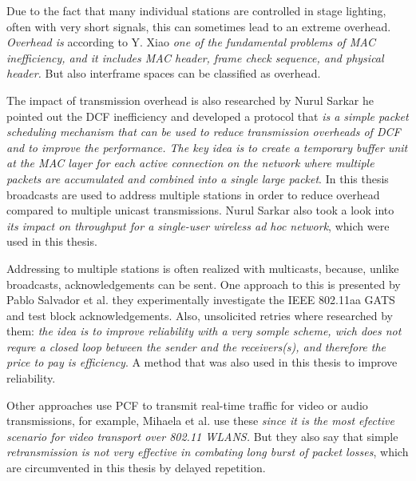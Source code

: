 Due to the fact that many individual stations are controlled in stage lighting, 
often with very short signals, this can sometimes lead to an extreme overhead.
\emph{Overhead is} 
according to Y. Xiao \cite{PerformanceEnhancement}
\emph{one of the fundamental problems of MAC inefficiency, and it includes MAC header, frame check sequence, and physical header.}
But also interframe spaces can be classified as overhead.

The impact of transmission overhead is also researched by Nurul Sarkar \cite{TheImpactOfOverheads}
he pointed out the DCF inefficiency and developed a protocol that
\emph{is a simple packet scheduling mechanism that can be used to reduce transmission overheads of DCF and to improve the performance. 
The key idea is to create a temporary buffer unit at the MAC layer for each active connection on the network 
where multiple packets are accumulated and combined into a single large packet}.
In this thesis broadcasts are used to address multiple stations 
in order to reduce overhead compared to multiple unicast transmissions.
Nurul Sarkar \cite{TheImpactOfOverheads} also took a look into 
\emph{its impact on throughput for a single-user wireless ad hoc network},
which were used in this thesis.

Addressing to multiple stations is often realized with multicasts, 
because, unlike broadcasts, acknowledgements can be sent. One approach to this is presented by Pablo Salvador et al. 
\cite{AFirstImplementation}
they experimentally investigate the IEEE 802.11aa GATS and test block acknowledgements.
Also, unsolicited retries where researched by them: 
\emph{the idea is to improve reliability with a very somple scheme, wich does not requre a 
closed loop between the sender and the receivers(s), and therefore the price to pay is efficiency}.
A method that was also used in this thesis to improve reliability.

Other approaches use PCF to transmit real-time traffic for video or audio transmissions,
for example, Mihaela et al. \cite{AdaptiveCrossLayer} use these 
\emph{since it is the most efective scenario for video transport over 802.11 WLANS.}
But they also say that simple 
\emph{retransmission is not very effective in combating long burst of packet losses},
which are circumvented in this thesis by delayed repetition.



